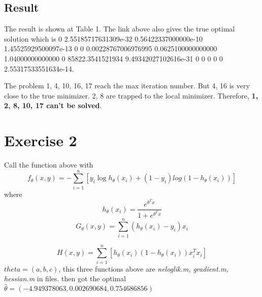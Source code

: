 \documentclass[12pt,a4paper]{article}
\begin{document}
\subsection{Result}
The result is shown at Table 1. The link above also gives the true optimal solution which is 
0 
2.55185717631309e-32 
0.56422337000000e-10 
1.45525929500097e-13 
0 
0 
0.00228767006976995 
0.0625100000000000 
1.04000000000000 
0 
85822.3541521934 
9.49342027102616e-31 
0 
0 
0 
0 
0 
2.55317533551634e-14.


The problem 1, 4, 10, 16, 17 reach the max iteration number. But 4, 16 is very close to the true minimizer. 2, 8 are trapped to the local minimizer. Therefore, \textbf{1, 2, 8, 10, 17 can't be solved}.
\section*{Exercise 2}
Call the function above with \[
f_\theta(x,y)=-\sum_{i=1}^{n}[y_i \log h_\theta(x_i)+(1-y_i)log(1-h_\theta(x_i))]
\]
where\[
h_\theta(x_i)=\frac{e^{\theta^T x}}{1+e^{\theta^T x}}
\]
\[
G_\theta(x,y)= \sum_{i=1}^n (h_\theta(x_i) - y_i) x_i
\]

\[
H(x,y)=\sum_{i=1}^n [h_\theta(x_i) (1 - h_\theta(x_i)) x_i^T x_i]
\]
$theta=(a,b,c)$, this three functions above are \emph{neloglik.m, gradient.m, hessian.m} in files.
then got the optimal $\hat{\theta}=(-4.949378063,  0.002690684,  0.754686856 
)$
\end{document}
